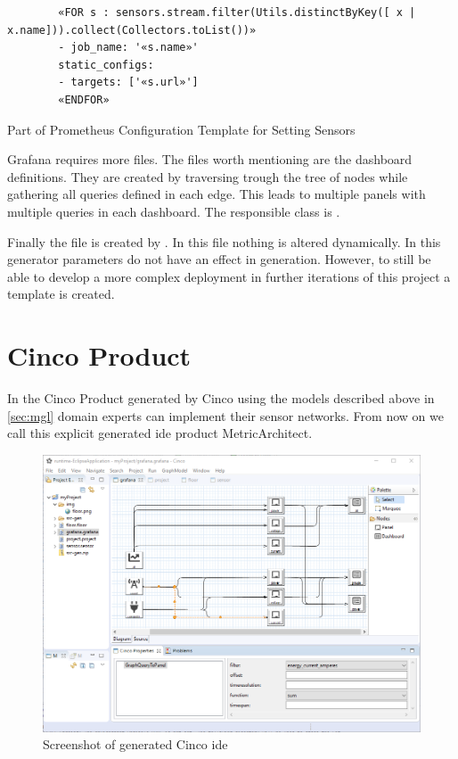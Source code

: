 \begin{listing}
	\begin{verbatim}
		«FOR s : sensors.stream.filter(Utils.distinctByKey([ x | x.name])).collect(Collectors.toList())»
		- job_name: '«s.name»'
		static_configs:
		- targets: ['«s.url»']
		«ENDFOR»
	\end{verbatim}
	\caption{Part of Prometheus Configuration Template for Setting Sensors}
	\label{lst:xtend_prom}
\end{listing} 

Grafana requires more files. The files worth mentioning are the dashboard definitions. They are created by traversing trough the tree of nodes while gathering all queries defined in each  edge. This leads to multiple panels with multiple queries in each dashboard. The responsible class is .

Finally the  file is created by . In this file nothing is altered dynamically. In this generator parameters do not have an effect in generation. However, to still be able to develop a more complex deployment in further iterations of this project a template is created.

\section{Cinco Product}

In the Cinco Product generated by Cinco using the models described above in \cref{sec:mgl} domain experts can implement their sensor networks. From now on we call this explicit generated \gls{ide} product MetricArchitect. 

\begin{figure}
	\includegraphics[width=\textwidth]{assets/images/editor}
	\caption{Screenshot of generated Cinco \gls{ide}}
	\label{fig:editor}
\end{figure}

